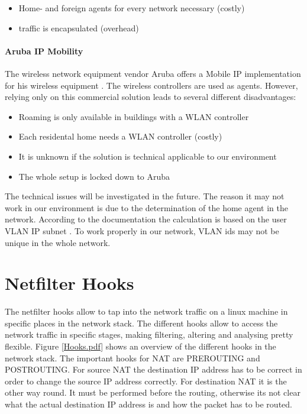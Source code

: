 \documentclass{report}
\begin{document}
\begin{itemize}
\itemsep1pt\parskip0pt
\item
  Home- and foreign agents for every network necessary (costly)
\item
  traffic is encapsulated (overhead)
\end{itemize}

\paragraph{Aruba IP Mobility}\label{aruba-ip-mobility}

The wireless network equipment vendor Aruba offers a Mobile IP
implementation for his wireless equipment \cite[p. 659]{MobileIP-Aruba}. The wireless
controllers are used as agents. However, relying only on this commercial
solution leads to several different disadvantages:

\begin{itemize}
\itemsep1pt\parskip0pt
\item
  Roaming is only available in buildings with a WLAN controller
\item
  Each residental home needs a WLAN controller (costly)
\item
  It is unknown if the solution is technical applicable to our environment
\item
  The whole setup is locked down to Aruba
\end{itemize}

The technical issues will be investigated in the future. The reason it may not
work in our environment is due to the determination of the home agent in the network.
According to the documentation the calculation is based on the user VLAN IP subnet \cite[p. 661]{MobileIP-Aruba}.
To work properly in our network, VLAN ids may not be unique in the whole network.


\section{Netfilter Hooks}\label{netfilter-hooks}

The netfilter hooks\cite{hooks} allow to tap into the network traffic on a linux
machine in specific places in the network stack. The different hooks
allow to access the network traffic in specific stages, making filtering,
altering and analysing pretty flexible. Figure \ref{Hooks.pdf} shows an overview of the different hooks in the network stack.
The important hooks for NAT are PREROUTING and
POSTROUTING. For source NAT the destination IP address has to be correct in order to change the source IP address correctly. For destination NAT
it is the other way round. It must be performed before the routing,
otherwise its not clear what the actual destination IP address is and how the packet has to be routed.
\end{document}
